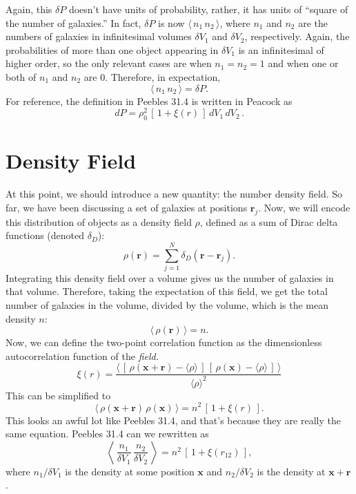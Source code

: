 \documentclass{article}
\begin{document}
Again, this $\delta P$ doesn't have units of probability, rather, it has units of \enquote{square of the number of galaxies.}
In fact, $\delta P$ is now $\langle\,n_1\,n_2\,\rangle$, where $n_1$ and $n_2$ are the numbers of galaxies in infinitesimal volumes $\delta V_1$ and $\delta V_2$, respectively. 
Again, the probabilities of more than one object appearing in $\delta V_1$ is an infinitesimal of higher order, so the only relevant cases are when $n_1=n_2=1$ and when one or both of $n_1$ and $n_2$ are 0. 
Therefore, in expectation,
\[
\langle\,n_1\,n_2\,\rangle=\delta P.
\]
For reference, the definition in Peebles 31.4 is written in Peacock as
\[
d P=\rho_0^2\,[\,1+\xi(r)\,]\,dV_1\,dV_2\,\tag{Peacock 16.29}.
\]

\section{Density Field}
At this point, we should introduce a new quantity: the number density field. 
So far, we have been discussing a set of galaxies at positions $\mathbf{r}_j$. 
Now, we will encode this distribution of objects as a density field $\rho$, defined as a sum of Dirac delta functions (denoted $\delta_D$):
\[
\rho(\mathbf{r})=\sum_{j=1}^{N}\delta_D(\mathbf{r}-\mathbf{r}_j).
\]
Integrating this density field over a volume gives us the number of galaxies in that volume. 
Therefore, taking the expectation of this field, we get the total number of galaxies in the volume, divided by the volume, which is the mean density $n$:
\[
\langle\,\rho(\mathbf{r})\,\rangle=n.\tag{Peebles 33.1}
\]
Now, we can define the two-point correlation function as the dimensionless autocorrelation function of the \textit{field.}
\[
\xi(r)=\frac{\langle\,[\,\rho(\mathbf{x}+\mathbf{r})-\langle\rho\rangle\,]\,[\,\rho(\mathbf{x})-\langle\rho\rangle\,]\,\rangle}{\langle\rho\rangle^2}\tag{Peebles 33.2}
\]
This can be simplified to 
\[
\langle\,\rho(\mathbf{x}+\mathbf{r})\,\rho(\mathbf{x})\,\rangle=n^2\,[\,1+\xi(r)\,].\tag{Peebles 33.3}
\]
This looks an awful lot like Peebles 31.4, and that's because they are really the same equation. 
Peebles 31.4 can we rewritten as
\[
\left\langle\,\frac{n_1}{\delta V_1}\,\frac{n_2}{\delta V_2}\,\right\rangle=n^2\,[\,1+\xi(r_{12})\,],
\]
where $n_1/\delta V_1$ is the density at some position $\mathbf{x}$ and $n_2/\delta V_2$ is the density at $\mathbf{x}+\mathbf{r}$.
\end{document}
